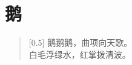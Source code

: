 \documentclass[12pt,UTF-8,openany]{ctexbook}
\begin{document}
\clearpage

\begin{center}
    
\end{center}


\hanzibox{}\hanzibox{}\hanzibox{}\hanzibox{}\hspace{1em}\hanzibox{}\hanzibox{}\hanzibox{}\hanzibox{}

\hanzibox{}\hanzibox{}\hanzibox{}\hanzibox{}\hspace{1em}\hanzibox{}\hanzibox{}\hanzibox{}\hanzibox{}

\hanzibox{}\hanzibox{}\hanzibox{}\hanzibox{}\hspace{1em}\hanzibox{}\hanzibox{}\hanzibox{}\hanzibox{}






\chapter{鹅}

\begin{large}
    
    \begin{verse}[0.5\linewidth]
        \phantom{鹅}鹅鹅鹅\phantom{鹅}，曲项向天歌。 \\
        白毛浮绿水，红掌拨清波。
    \end{verse}
    
\end{large}


\clearpage

\begin{center}
    
\end{center}


\hanzibox{}\hanzibox{}\hanzibox{}\hanzibox{}\hspace{1em}\hanzibox{}\hanzibox{}\hanzibox{}\hanzibox{}

\hanzibox{}\hanzibox{}\hanzibox{}\hanzibox{}\hspace{1em}\hanzibox{}\hanzibox{}\hanzibox{}\hanzibox{}

\hanzibox{}\hanzibox{}\hanzibox{}\hanzibox{}\hspace{1em}\hanzibox{}\hanzibox{}\hanzibox{}\hanzibox{}

\hanzibox{}\hanzibox{}\hanzibox{}\hanzibox{}\hspace{1em}
\end{document}
